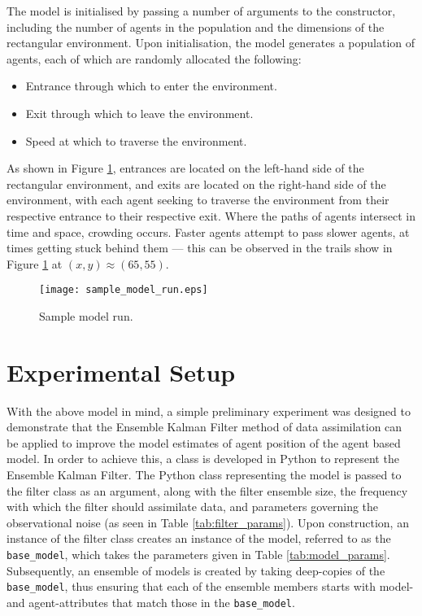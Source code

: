 The model is initialised by passing a number of arguments to the constructor,
including the number of agents in the population and the dimensions of the
rectangular environment.
Upon initialisation, the model generates a population of agents, each of which
are randomly allocated the following:
\begin{itemize}
    \item Entrance through which to enter the environment.
    \item Exit through which to leave the environment.
    \item Speed at which to traverse the environment.
\end{itemize}
As shown in Figure \ref{fig:sample_model_run}, entrances are located on the
left-hand side of the rectangular environment, and exits are located on the
right-hand side of the environment, with each agent seeking to traverse the
environment from their respective entrance to their respective exit.
Where the paths of agents intersect in time and space, crowding occurs.
Faster agents attempt to pass slower agents, at times getting stuck behind them
--- this can be observed in the trails show in Figure \ref{fig:sample_model_run}
at $(x, y) \approx (65, 55)$.

\begin{figure}[h]
    \centering
    \texttt{[image: sample\_model\_run.eps]}
    \caption{Sample model run.}
    \label{fig:sample_model_run}
\end{figure}

\section{Experimental Setup}\label{sec:method:experiments}

With the above model in mind, a simple preliminary experiment was designed to
demonstrate that the Ensemble Kalman Filter method of data assimilation can be
applied to improve the model estimates of agent position of the agent based
model.
In order to achieve this, a class is developed in Python to represent the
Ensemble Kalman Filter.
The Python class representing the model is passed to the filter class as an
argument, along with the filter ensemble size, the frequency with which the
filter should assimilate data, and parameters governing the observational noise
(as seen in Table \ref{tab:filter_params}).
Upon construction, an instance of the filter class creates an instance of the
model, referred to as the \texttt{base\_model}, which takes the parameters given
in Table \ref{tab:model_params}.
Subsequently, an ensemble of models is created by taking deep-copies of the
\texttt{base\_model}, thus ensuring that each of the ensemble members starts
with model- and agent-attributes that match those in the \texttt{base\_model}.

